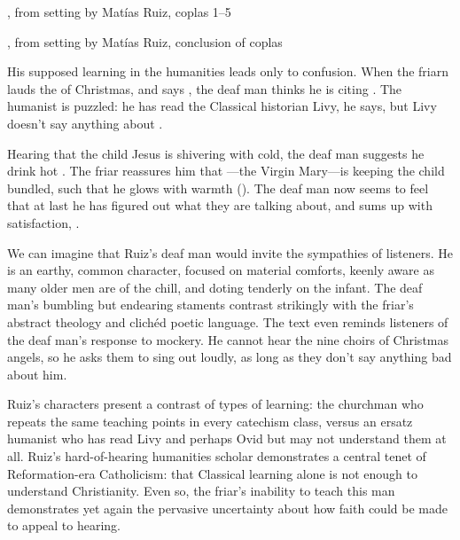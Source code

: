 \begin{expoem}
    \caption{, from setting by Matías Ruiz, coplas 1--5}
    \label{expoem:Pues_la_fiesta-Ruiz-coplas-1}
\end{expoem}

\begin{expoem}
    \caption{, from setting by Matías Ruiz, conclusion of coplas}
    \label{expoem:Pues_la_fiesta-Ruiz-coplas-2}
\end{expoem}

His supposed learning in the humanities leads only to confusion.
When the friarn lauds the  of Christmas, and says , the deaf man thinks he is citing .
The humanist is puzzled: he has read the Classical historian Livy, he says, but Livy doesn't say anything about .

Hearing that the child Jesus is shivering with cold, the deaf man suggests he drink hot .
The friar reassures him that ---the Virgin Mary---is keeping the child bundled, such that he glows with warmth ().
The deaf man now seems to feel that at last he has figured out what they are talking about, and sums up with satisfaction, .

We can imagine that Ruiz's deaf man would invite the sympathies of listeners.
He is an earthy, common character, focused on material comforts, keenly aware as many older men are of the chill, and doting tenderly on the infant.
The deaf man's bumbling but endearing staments contrast strikingly with the friar's abstract theology and clichéd poetic language.
The text even reminds listeners of the deaf man's response to mockery.
He cannot hear the nine choirs of Christmas angels, so he asks them to sing out loudly, as long as they don't say anything bad about him.

Ruiz's characters present a contrast of types of learning: the churchman who repeats the same teaching points in every catechism class, versus an ersatz humanist who has read Livy and perhaps Ovid but may not understand them at all.
Ruiz's hard-of-hearing humanities scholar demonstrates a central tenet of Reformation-era Catholicism: that Classical learning alone is not enough to understand Christianity.
Even so, the friar's inability to teach this man demonstrates yet again the pervasive uncertainty about how faith could be made to appeal to hearing.


